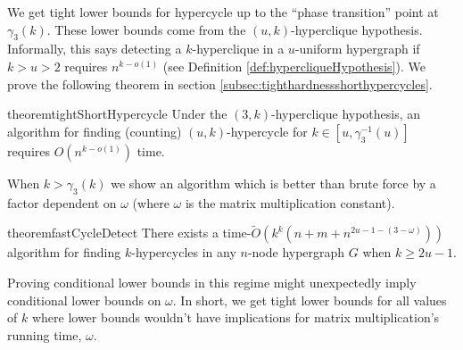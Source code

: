 \documentclass[11pt,letterpaper,pdftex]{article}
\begin{document}
We get tight lower bounds for hypercycle up to the ``phase transition'' point at $ \gamma_3(k)$. These lower bounds come from the $(u,k)$-hyperclique hypothesis. Informally, this says detecting a $k$-hyperclique in a $u$-uniform hypergraph if $k > u > 2$ requires $n^{k-o(1)}$ (see Definition \ref{def:hypercliqueHypothesis}).  We prove the following theorem in section \ref{subsec:tighthardnessshorthypercycles}.

\begin{restatable}{theorem}{tightShortHypercycle}\label{thm:tight short hypercycle}
    Under the $(3,k)$-hyperclique hypothesis, an algorithm for finding (counting)  $(u,k)$-hypercycle for $k \in [u,\gamma_3^{-1}(u)]$ requires $O(n^{k-o(1)})$ time.
\end{restatable}

When $k > \gamma_3(k)$ we show an algorithm which is better than brute force by a factor dependent on $\omega$ (where $\omega$ is the matrix multiplication constant). 
\begin{restatable}{theorem}{fastCycleDetect} \label{thm:fastCycledetect}
    There exists a time-$\tilde{O}(k^k(n+m+n^{2u-1-(3-\omega)}))$ algorithm for finding $k$-hypercycles in any $n$-node hypergraph $G$ when $k \geq 2u-1$. 
\end{restatable}

Proving conditional lower bounds in this regime might unexpectedly imply conditional lower bounds on $\omega$.
In short, we get tight lower bounds for all values of $k$ where lower bounds wouldn't have implications for matrix multiplication's running time, $\omega$.
\end{document}
